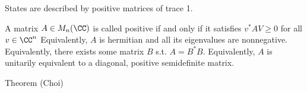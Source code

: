States are described by positive matrices of trace 1.

A matrix $A \in M_n(\CC)$ is called positive if and only if it satisfies 
$v^* A V \ge 0$ for all $v \in \CC^n$  Equivalently, $A$ is hermitian
and all its eigenvalues are nonnegative.  Equivalently, there exists
some matrix $B$ s.t. $A = B^*B$.  Equivalently, $A$ is unitarily equivalent
to a diagonal, positive semidefinite matrix.

Theorem (Choi)

